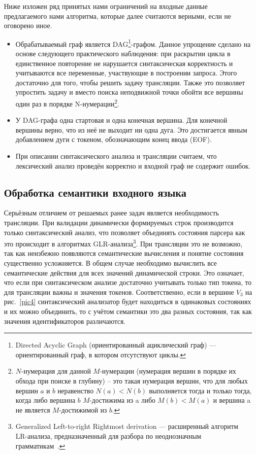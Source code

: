 \documentclass{llncs}
\begin{document}
	Ниже изложен ряд принятых нами ограничений на входные данные предлагаемого нами алгоритма, которые далее считаются верными, если не оговорено иное.
	\begin{itemize}
        \item Обрабатываемый граф является DAG\footnote{Directed Acyclic Graph (ориентированный ациклический граф) —  ориентированный граф, в котором отсутствуют циклы.}-графом. Данное упрощение сделано на основе следующего практического наблюдения: при раскрытии цикла в единственное повторение не нарушается синтаксическая корректность и учитываются все переменные, участвующие в построении запроса. Этого достаточно для того, чтобы решить задачу трансляции. Также это  позволяет упростить задачу и вместо поиска неподвижной точки обойти все вершины один раз в порядке N-нумерации\footnote{$N$-нумерация для данной $M$-нумерации (нумерация вершин в порядке их обхода при поиске в глубину) -- это такая нумерация  вершин, что для любых вершин  $a$ и $b$ неравенство $N(a)<N(b)$ выполняется тогда и только тогда, когда либо вершина $b$ $M$-достижима из a либо $M(b)<M(a)$  и вершина a не является $M$-достижимой из $b$. }.
        \item У DAG-графа одна стартовая и одна конечная вершина. Для конечной вершины верно, что из неё не выходит ни одна дуга. Это достигается явным добавлением дуги с токеном, обозначающим конец ввода (EOF).
        \item При описании синтаксического анализа и трансляции считаем, что лексический анализ проведён корректно и входной граф не содержит ошибок.
    \end{itemize}


\subsection{Обработка семантики входного языка}

Серьёзным отличием от решаемых ранее задач является необходимость трансляции. При валидации динамически формируемых строк производится только синтаксический анализ, что позволяет объединять состояния парсера как это происходит в алгоритмах GLR-анализа\footnote{Generalized Left-to-right Rightmost derivation —  расширенный алгоритм LR-анализа, предназначенный для разбора по неоднозначным грамматикам~\cite{Grune}.}. При трансляции это не возможно, так как неизбежно появляются семантические вычисления и понятие состояния существенно усложняется. В общем случае необходимо вычислить все семантические действия для всех значений динамической строки. Это означает, что если при синтаксическом анализе достаточно учитывать только тип токена, то для трансляции важны и значения токенов. Соответственно, если в вершине $V_3$ на рис.~\ref{pic4} синтаксический анализатор будет находиться в одинаковых состояниях и их можно объединить, то с учётом семантики это два разных состояния, так как значения идентификаторов различаются.
\end{document}
